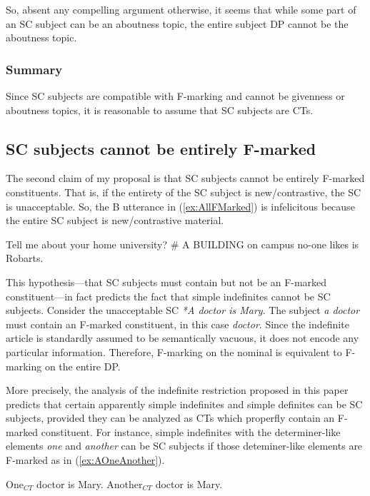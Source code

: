 \documentclass[
	letterpaper,
]{article}
\begin{document}
So, absent any compelling argument otherwise, it seems that while some part of an SC subject can be an aboutness topic, the entire subject DP cannot be the aboutness topic.

\subsubsection{Summary}
Since SC subjects are compatible with F-marking and cannot be givenness or aboutness topics, it is reasonable to assume that SC subjects are CTs.
\subsection{SC subjects cannot be entirely F-marked}
The second claim of my proposal is that SC subjects cannot be entirely F-marked constituents.
That is, if the entirety of the SC subject is new/contrastive, the SC is unacceptable.
So, the B utterance in (\ref{ex:AllFMarked}) is infelicitous because the entire SC subject is new/contrastive material.
\begin{exe}
\ex\label{ex:AllFMarked}
\begin{xlist}
	 Tell me about your home university?
	\# A BUILDING on campus no-one likes is Robarts.
\end{xlist}	
\end{exe}
This hypothesis---that SC subjects must contain but not be an F-marked constituent---in fact predicts the fact that simple indefinites cannot be SC subjects.
Consider the unacceptable SC \textit{*A doctor is Mary}.
The subject \textit{a doctor} must contain an F-marked constituent, in this case \textit{doctor}.
Since the indefinite article is standardly assumed to be semantically vacuous, it does not encode any particular information.
Therefore, F-marking on the nominal is equivalent to F-marking on the entire DP.

More precisely, the analysis of the indefinite restriction proposed in this paper predicts that certain apparently simple indefinites and simple definites can be SC subjects, provided they can be analyzed as CTs which properfly contain an F-marked constituent.
For instance, simple indefinites with the determiner-like elements \textit{one} and \textit{another} can be SC subjects if those deteminer-like elements are F-marked as in (\ref{ex:AOneAnother}).
\begin{exe}
\ex\label{ex:AOneAnother}
\begin{xlist}
	\ex\label{ex:OneCT} One$_{CT}$ doctor is Mary.
	\ex\label{ex:AnotherCT} Another$_{CT}$ doctor is Mary.
\end{xlist}
\end{exe}
\end{document}
